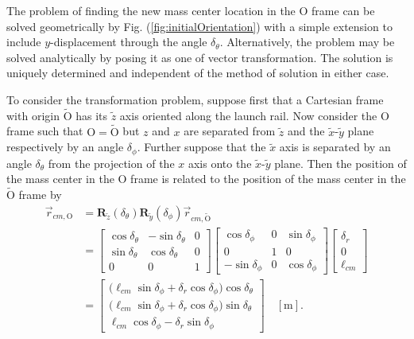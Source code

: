 \documentclass[11pt]{thesis}
\numberwithin{equation}{section}
\begin{document}
The problem of finding the new mass center location in the $\mathrm{O}$ frame can be solved geometrically by Fig. (\ref{fig:initialOrientation}) with a simple extension to include $y$-displacement through the angle $\delta_\theta$. Alternatively, the problem may be solved analytically by posing it as one of vector transformation. The solution is uniquely determined and independent of the method of solution in either case.

To consider the transformation problem, suppose first that a Cartesian frame with origin $\widetilde{\mathrm{O}}$ has its $\tilde{z}$ axis oriented along the launch rail. Now consider the $\mathrm{O}$ frame such that $\mathrm{O} = \widetilde{\mathrm{O}}$ but $z$ and $x$ are separated from $\tilde{z}$ and the $\tilde{x}$-$\tilde{y}$ plane respectively by an angle $\delta_\phi$. Further suppose that the $\tilde{x}$ axis is separated by an angle $\delta_\theta$ from the projection of the $x$ axis onto the $\tilde{x}$-$\tilde{y}$ plane. Then the position of the mass center in the $\mathrm{O}$ frame is related to the position of the mass center in the $\widetilde{\mathrm{O}}$ frame by
\begin{align}
\vec{r}_{cm\mathrm{,O}} &= \mathbf{R}_{\tilde{z}}(\delta_\theta) \mathbf{R}_{\tilde{y}}(\delta_\phi) \vec{r}_{cm\mathrm{,\widetilde{\mathrm{O}}}} \\
&= \begin{bmatrix}\cos\delta_\theta & -\sin\delta_\theta & 0 \\ \sin\delta_\theta & \cos\delta_\theta & 0 \\ 0 & 0 & 1\end{bmatrix} \begin{bmatrix}\cos\delta_\phi & 0 & \sin\delta_\phi \\ 0 & 1 & 0 \\ -\sin\delta_\phi & 0 & \cos\delta_\phi\end{bmatrix} \begin{bmatrix}\delta_r \\ 0 \\ \ell_{cm}\end{bmatrix} \\
&= \begin{bmatrix}\big(\ell_{cm} \sin \delta_\phi + \delta_r \cos \delta_\phi\big) \cos\delta_\theta \\ \big(\ell_{cm} \sin \delta_\phi + \delta_r \cos \delta_\phi\big) \sin\delta_\theta \\ \ell_{cm} \cos \delta_\phi - \delta_r \sin \delta_\phi\end{bmatrix} \quad [\si{\m}].
\end{align}
\end{document}

